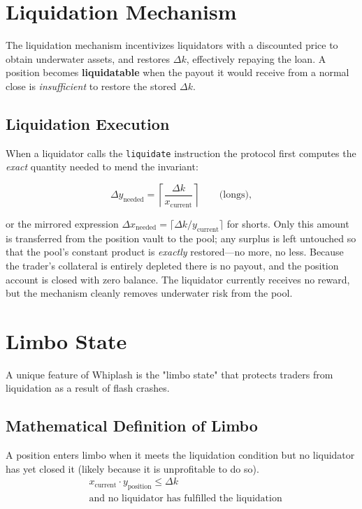 \documentclass[11pt]{article}
\begin{document}
\section{Liquidation Mechanism}

The liquidation mechanism incentivizes liquidators with a discounted price to obtain underwater assets, and restores $\Delta k$, effectively repaying the loan. A position becomes \textbf{liquidatable} when the payout it would receive from a normal close is \emph{insufficient} to restore the stored $\Delta k$.
\subsection{Liquidation Execution}

When a liquidator calls the \texttt{liquidate} instruction the protocol first computes the \emph{exact} quantity needed to mend the invariant:

\begin{equation}
\Delta y_{\text{needed}} = \left\lceil \frac{\Delta k}{x_{\text{current}}} \right\rceil \qquad\text{(longs)},
\end{equation}

or the mirrored expression $\Delta x_{\text{needed}} = \lceil \Delta k / y_{\text{current}} \rceil$ for shorts. Only this amount is transferred from the position vault to the pool; any surplus is left untouched so that the pool's constant product is \emph{exactly} restored—no more, no less. Because the trader's collateral is entirely depleted there is no payout, and the position account is closed with zero balance. The liquidator currently receives no reward, but the mechanism cleanly removes underwater risk from the pool.

\section{Limbo State}

A unique feature of Whiplash is the "limbo state" that protects traders from liquidation as a result of flash crashes.

\subsection{Mathematical Definition of Limbo}

A position enters limbo when it meets the liquidation condition but no liquidator has yet closed it (likely because it is unprofitable to do so).
\begin{equation}
\begin{aligned}
&x_{\text{current}} \cdot y_{\text{position}} \le \Delta k \\
&\text{and no liquidator has fulfilled the liquidation}
\end{aligned}
\end{equation}
\end{document}
